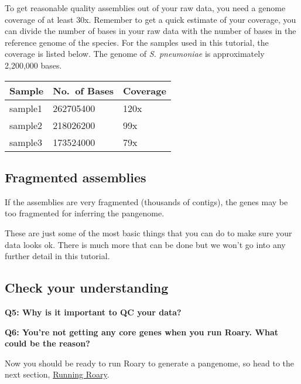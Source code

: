 \documentclass[11pt]{article}
\begin{document}
To get reasonable quality assemblies out of your raw data, you need a
genome coverage of at least 30x. Remember to get a quick estimate of
your coverage, you can divide the number of bases in your raw data with
the number of bases in the reference genome of the species. For the
samples used in this tutorial, the coverage is listed below. The genome
of \textit{S. pneumoniae} is approximately 2,200,000 bases.

\begin{longtable}[]{@{}lll@{}}
\toprule
Sample & No.~of Bases & Coverage \\
\midrule
\endhead
sample1 & 262705400 & 120x \\
sample2 & 218026200 & 99x \\
sample3 & 173524000 & 79x \\
\bottomrule
\end{longtable}

\hypertarget{fragmented-assemblies}{%
\subsection{Fragmented assemblies}\label{fragmented-assemblies}}

If the assemblies are very fragmented (thousands of contigs), the genes
may be too fragmented for inferring the pangenome.

These are just some of the most basic things that you can do to make
sure your data looks ok. There is much more that can be done but we
won't go into any further detail in this tutorial.

\hypertarget{check-your-understanding}{%
\subsection{Check your understanding}\label{check-your-understanding}}

\textbf{Q5: Why is it important to QC your data?}

\textbf{Q6: You're not getting any core genes when you run Roary. What
could be the reason?}

    Now you should be ready to run Roary to generate a pangenome, so head to
the next section, \href{run_roary.ipynb}{Running Roary}.





\newpage
\end{document}
